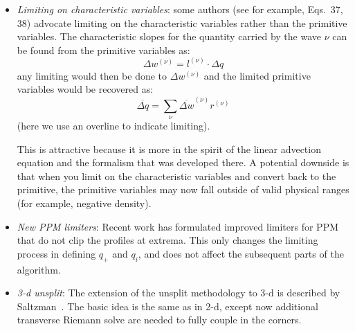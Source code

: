 \begin{itemize}
\item {\em Limiting on characteristic variables}: some authors
  (see for example, \cite{athena} Eqs.~37, 38) advocate limiting
  on the characteristic variables rather than the primitive variables.
  The characteristic slopes for the quantity carried by the wave $\nu$
  can be found from the primitive variables as:
  \begin{equation}
  \Delta w^{(\nu)} = l^{(\nu)} \cdot \Delta q
  \end{equation}
  any limiting would then be done to $\Delta w^{(\nu)}$ and the
  limited primitive variables would be recovered as:
  \begin{equation}
  \overline{\Delta q} = \sum_\nu \overline{\Delta w}^{(\nu)} r^{(\nu)}
  \end{equation}
  (here we use an overline to indicate limiting). 

  This is attractive because it is more in the spirit of the linear
  advection equation and the formalism that was developed there.  A
  potential downside is that when you limit on the characteristic
  variables and convert back to the primitive, the primitive variables
  may now fall outside of valid physical ranges (for example, negative
  density).

\item {\em New PPM limiters}:
Recent work \cite{colellasekora} has formulated improved limiters for
PPM that do not clip the profiles at extrema.  This only changes the
limiting process in defining $q_+$ and $q_i$, and does not affect the
subsequent parts of the algorithm.


\item {\em 3-d unsplit}:
The extension of the unsplit methodology to 3-d is described by
Saltzman~\cite{saltzman:1994}.  The basic idea is the same as in 2-d,
except now additional transverse Riemann solve are needed to fully
couple in the corners.

\end{itemize}

